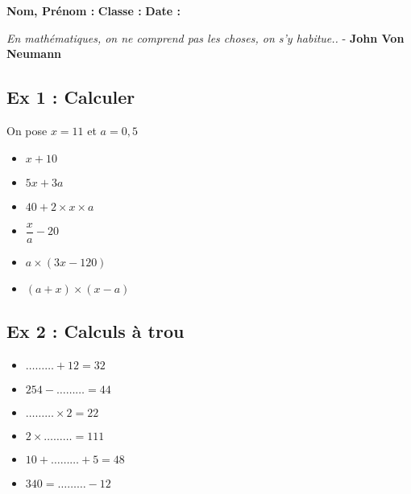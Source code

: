 



\textbf{Nom, Prénom :} \hspace{8cm} \textbf{Classe :} \hspace{3cm} \textbf{Date :}\\

\begin{center}
  \textit{En mathématiques, on ne comprend pas les choses, on s’y habitue..}  - \textbf{John Von Neumann}
\end{center}


\subsection*{Ex 1 : Calculer}


On pose $x = 11$ et $a = 0,5$

\begin{multicols}{2}\begin{itemize}[label={$\bullet$}]
  \item $x + 10$ \dotfill
  \item $5x + 3a$ \dotfill
  \item $40 + 2 \times x \times a$ \dotfill
  \item $\dfrac{x}{a} - 20$ \dotfill
  \item $a \times (3x - 120)$ \dotfill
  \item $(a+x) \times (x-a)$ \dotfill
\end{itemize}\end{multicols}

\subsection*{Ex 2 : Calculs à trou}

\begin{multicols}{2}\begin{itemize}[label={$\bullet$}]
  \item $\ldots\ldots\ldots + 12 = 32$
  \item $254 - \ldots\ldots\ldots = 44$
  \item $\ldots\ldots\ldots \times 2 = 22$
  \item $2 \times \ldots\ldots\ldots = 111$
  \item $10 + \ldots\ldots\ldots + 5 = 48$
  \item $340 = \ldots\ldots\ldots - 12$
\end{itemize}\end{multicols}

